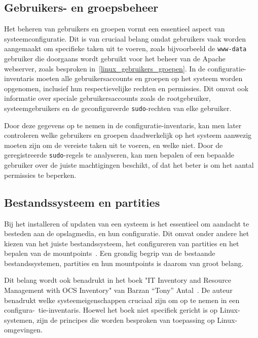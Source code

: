\subsection{Gebruikers- en groepsbeheer}
\label{risico_gebruikers_groepen}

Het beheren van gebruikers en groepen vormt een essentieel aspect van systeemconfiguratie.
Dit is van cruciaal belang omdat gebruikers vaak worden aangemaakt om specifieke taken uit te voeren, zoals bijvoorbeeld de \texttt{www-data} gebruiker die doorgaans wordt gebruikt voor het beheer van de Apache webserver, zoals besproken in~\ref{linux_gebruikers_groepen}.
In de configuratie-inventaris moeten alle gebruikersaccounts en groepen op het systeem worden opgenomen, inclusief hun respectievelijke rechten en permissies.
Dit omvat ook informatie over speciale gebruikersaccounts zoals de rootgebruiker, systeemgebruikers en de geconfigureerde \texttt{sudo}-rechten van elke gebruiker.

Door deze gegevens op te nemen in de configuratie-inventaris, kan men later controleren welke gebruikers en groepen daadwerkelijk op het systeem aanwezig moeten zijn om de vereiste taken uit te voeren, en welke niet.
Door de geregistreerde \texttt{sudo}-regels te analyseren, kan men bepalen of een bepaalde gebruiker over de juiste machtigingen beschikt, of dat het beter is om het aantal permissies te beperken.

\subsection{Bestandssysteem en partities}
\label{risico_bestandsysteem_partities}

Bij het installeren of updaten van een systeem is het essentieel om aandacht te besteden aan de opslagmedia, en hun configuratie.
Dit omvat onder andere het kiezen van het juiste bestandssysteem, het configureren van partities en het bepalen van de mountpoints~\autocite{wirzenius1993linux}.
Een grondig begrip van de bestaande bestandssystemen, partities en hun mountpoints is daarom van groot belang.

Dit belang wordt ook benadrukt in het boek "IT Inventory and Resource Management with OCS Inventory" van Barzan ``Tony'' Antal~\autocite{Antal2010}.
De auteur benadrukt welke systeemeigenschappen cruciaal zijn om op te nemen in een configura-\ tie-inventaris.
Hoewel het boek niet specifiek gericht is op Linux-systemen, zijn de principes die worden besproken van toepassing op Linux-omgevingen.

